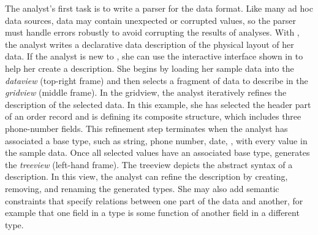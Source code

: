 
The analyst's first task is to write a parser for the \dibbler{} data
format.  Like many ad hoc data sources, \dibbler{} data may contain
unexpected or corrupted values, so the parser must handle errors
robustly to avoid corrupting the results of analyses.  With \pads{},
the analyst writes a declarative data description of the physical
layout of her data.  If the analyst is new to \pads{}, she can use the
\launchpads{} interactive interface shown in
 to help her create a \pads{} description.
She begins by loading her sample data into the {\it dataview}
(top-right frame) and then selects a fragment of data to describe in
the {\it gridview} (middle frame).  In the gridview, the analyst
iteratively refines the description of the selected data.  In this
example, she has selected the header part of an order record and
is defining its composite structure, which includes three phone-number fields.
This refinement step terminates when the analyst has associated a base
type, such as string, phone number, date, \etc{}, with every value in
the sample data.  Once all selected values have an associated base
type, \textsc{\launchpads{}} generates the {\it treeview} (left-hand
frame).  The treeview depicts the abstract syntax of a \pads{}
description.  In this view, the analyst can refine the description by
creating, removing, and renaming the generated types.  She may also
add semantic constraints that specify relations between one part of
the data and another, for example that one field in a type is some
function of another field in a different type.
